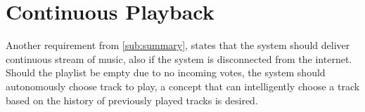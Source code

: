 \section{Continuous Playback}

Another requirement from \cref{sub:summary}, states that the system should deliver continuous stream of music, also if the system is disconnected from the internet. Should the playlist be empty due to no incoming votes, the system should autonomously choose track to play, a concept that can intelligently choose a track based on the history of previously played tracks is desired.
